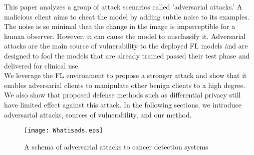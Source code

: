 This paper analyzes a group of attack scenarios called 'adversarial attacks.' A malicious client aims to cheat the model by adding subtle noise to its examples. The noise is so minimal that the change in the image is imperceptible for a human observer. However, it can cause the model to misclassify it. 
Adversarial attacks are the main source of vulnerability to the deployed FL models \cite{bouacida2021vulnerabilities,lyu2020threats,costa2021covert,lyu2020privacy}\. and are designed to fool the models that  are already trained 
passed their test phase and delivered for clinical use. 
\\We leverage the FL environment to propose a stronger attack and show that it enables adversarial clients to manipulate other benign clients to a high degree.  
We also show that proposed defense methods such as differential privacy still have limited effect against this attack.
In the following sections, we introduce adversarial attacks, sources of vulnerability, and our method.

\begin{figure}[t!]
 \centering
 \texttt{[image: Whatisads.eps]}
 \caption{A schema of adversarial attacks to cancer detection systems}
 \label{fig:pgd-atta-comparison}
\end{figure}
 
 




